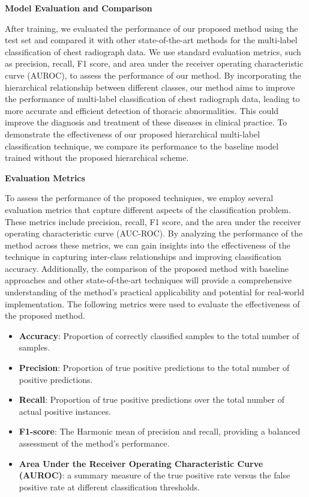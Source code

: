 \documentclass[preprint,3p,times, review]{elsarticle}
\begin{document}
\textbf{Model Evaluation and Comparison}

After training, we evaluated the performance of our proposed method using the test set and compared it with other state-of-the-art methods for the multi-label classification of chest radiograph data. We use standard evaluation metrics, such as precision, recall, F1 score, and area under the receiver operating characteristic curve (AUROC), to assess the performance of our method. By incorporating the hierarchical relationship between different classes, our method aims to improve the performance of multi-label classification of chest radiograph data, leading to more accurate and efficient detection of thoracic abnormalities. This could improve the diagnosis and treatment of these diseases in clinical practice. To demonstrate the effectiveness of our proposed hierarchical multi-label classification technique, we compare its performance to the baseline model trained without the proposed hierarchical scheme.

\textbf{Evaluation Metrics}

To assess the performance of the proposed techniques, we employ several evaluation metrics that capture different aspects of the classification problem. These metrics include precision, recall, F1 score, and the area under the receiver operating characteristic curve (AUC-ROC). By analyzing the performance of the method across these metrics, we can gain insights into the effectiveness of the technique in capturing inter-class relationships and improving classification accuracy. Additionally, the comparison of the proposed method with baseline approaches and other state-of-the-art techniques will provide a comprehensive understanding of the method's practical applicability and potential for real-world implementation. The following metrics were used to evaluate the effectiveness of the proposed method.

\begin{itemize}
    \item \textbf{Accuracy}: Proportion of correctly classified samples to the total number of samples.

    \item \textbf{Precision}: Proportion of true positive predictions to the total number of positive predictions.

    \item \textbf{Recall}: Proportion of true positive predictions over the total number of actual positive instances.

    \item \textbf{F1-score}: The Harmonic mean of precision and recall, providing a balanced assessment of the method's performance.

    \item \textbf{Area Under the Receiver Operating Characteristic Curve (AUROC)}: a summary measure of the true positive rate versus the false positive rate at different classification thresholds.
\end{itemize}
\end{document}
